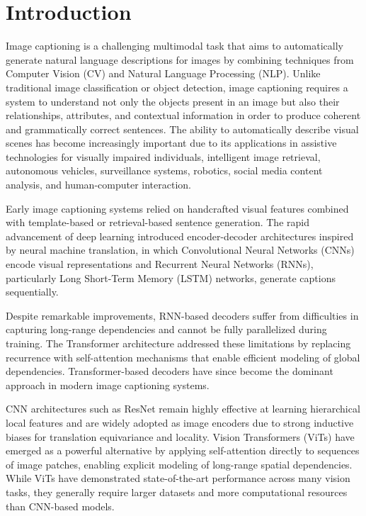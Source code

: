 \documentclass[conference]{IEEEtran}
\begin{document}
\section{Introduction}

Image captioning is a challenging multimodal task that aims to automatically generate natural language descriptions for images by combining techniques from Computer Vision (CV) and Natural Language Processing (NLP). Unlike traditional image classification or object detection, image captioning requires a system to understand not only the objects present in an image but also their relationships, attributes, and contextual information in order to produce coherent and grammatically correct sentences. The ability to automatically describe visual scenes has become increasingly important due to its applications in assistive technologies for visually impaired individuals, intelligent image retrieval, autonomous vehicles, surveillance systems, robotics, social media content analysis, and human-computer interaction.

Early image captioning systems relied on handcrafted visual features combined with template-based or retrieval-based sentence generation. The rapid advancement of deep learning introduced encoder-decoder architectures inspired by neural machine translation, in which Convolutional Neural Networks (CNNs) encode visual representations and Recurrent Neural Networks (RNNs), particularly Long Short-Term Memory (LSTM) networks, generate captions sequentially.

Despite remarkable improvements, RNN-based decoders suffer from difficulties in capturing long-range dependencies and cannot be fully parallelized during training. The Transformer architecture addressed these limitations by replacing recurrence with self-attention mechanisms that enable efficient modeling of global dependencies. Transformer-based decoders have since become the dominant approach in modern image captioning systems.

CNN architectures such as ResNet remain highly effective at learning hierarchical local features and are widely adopted as image encoders due to strong inductive biases for translation equivariance and locality. Vision Transformers (ViTs) have emerged as a powerful alternative by applying self-attention directly to sequences of image patches, enabling explicit modeling of long-range spatial dependencies. While ViTs have demonstrated state-of-the-art performance across many vision tasks, they generally require larger datasets and more computational resources than CNN-based models.
\end{document}
